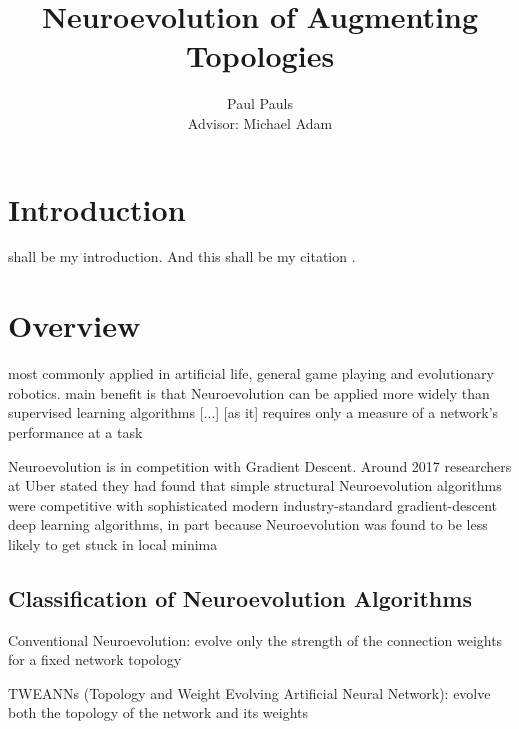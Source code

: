 \documentclass[journal, a4paper]{IEEEtran}
\begin{document}
  \title{Neuroevolution of Augmenting Topologies}
  \author{Paul Pauls\\
          Advisor: Michael Adam}
  \maketitle

\begin{abstract}
\blindtext
\end{abstract}


\section{Introduction}

 shall be my introduction. And this shall be my citation \cite{cite01}.




\section{Overview}

most commonly applied in artificial life, general game playing and evolutionary robotics.
main benefit is that Neuroevolution can be applied more widely than supervised learning algorithms [...] [as it] requires only a measure of a network's performance at a task

Neuroevolution is in competition with Gradient Descent. Around 2017 researchers at Uber stated they had found that simple structural Neuroevolution algorithms were competitive with sophisticated modern industry-standard gradient-descent deep learning algorithms, in part because Neuroevolution was found to be less likely to get stuck in local minima


\subsection{Classification of Neuroevolution Algorithms}
Conventional Neuroevolution:
evolve only the strength of the connection weights for a fixed network topology

TWEANNs (Topology and Weight Evolving Artificial Neural Network):
evolve both the topology of the network and its weights
\end{document}
